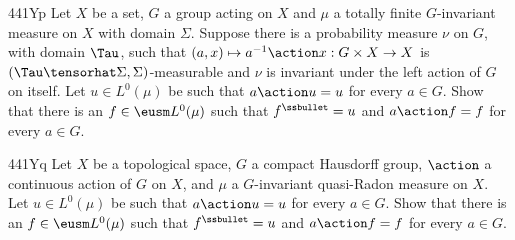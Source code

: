 {\spheader 441Yp
Let $X$ be a set, $G$ a group acting on $X$
and $\mu$ a totally finite $G$-invariant measure on
$X$ with domain $\Sigma$.   Suppose there is a probability measure $\nu$ on
$G$, with domain $\Tau$, such that
$(a,x)\mapsto a^{-1}\action x:G\times X\to X$ is
$(\Tau\tensorhat\Sigma,\Sigma)$-measurable and $\nu$ is invariant under the
left action of $G$ on itself.   Let $u\in L^0(\mu)$ be such that
$a\action u=u$ for every $a\in G$.  Show that there is an
$f\in\eusm L^0(\mu)$ such that $f^{\ssbullet}=u$ and $a\action f=f$ for
every $a\in G$.   

\spheader 441Yq
Let $X$ be a topological space, $G$ a compact Hausdorff
group, $\action$ a continuous action of $G$ on $X$,
and $\mu$ a $G$-invariant quasi-Radon measure on $X$.
Let $u\in L^0(\mu)$ be such that
$a\action u=u$ for every $a\in G$.  Show that there is an
$f\in\eusm L^0(\mu)$ such that $f^{\ssbullet}=u$ and $a\action f=f$ for
every $a\in G$.

}%

